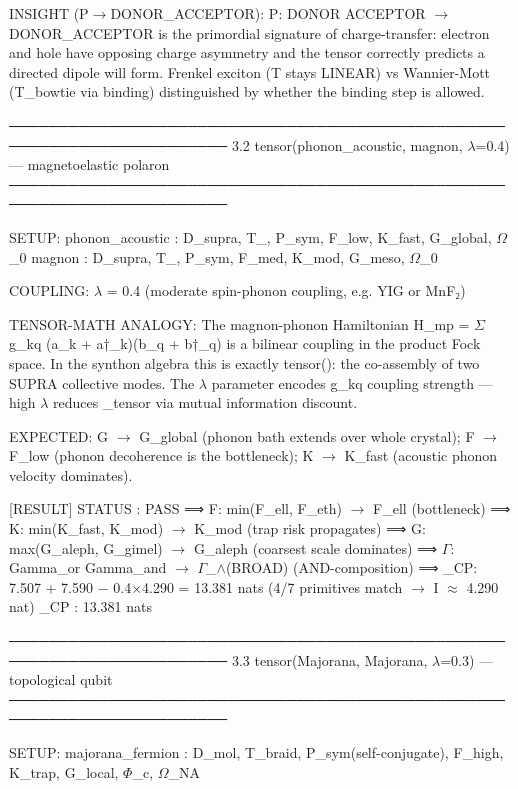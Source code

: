 \documentclass[12pt,a4paper]{article}
\begin{document}
INSIGHT (P$\rightarrow$DONOR\_ACCEPTOR):
P: DONOR \otimes ACCEPTOR $\rightarrow$ DONOR\_ACCEPTOR is the primordial signature of
charge-transfer: electron and hole have opposing charge asymmetry and
the tensor correctly predicts a directed dipole will form.
Frenkel exciton (T stays LINEAR) vs Wannier-Mott (T\_bowtie via binding)
distinguished by whether the binding step is allowed.

────────────────────────────────────────────────────────────────────────
3.2  tensor(phonon\_acoustic, magnon, $\lambda$=0.4) --- magnetoelastic polaron
────────────────────────────────────────────────────────────────────────

SETUP:
phonon\_acoustic : D\_supra, T\_\textbar{}, P\_sym,  F\_low, K\_fast, G\_global, $\Omega$\_0
magnon          : D\_supra, T\_\textbar{}, P\_sym,  F\_med, K\_mod,  G\_meso,   $\Omega$\_0

COUPLING: $\lambda$ = 0.4 (moderate spin-phonon coupling, e.g. YIG or MnF₂)

TENSOR-MATH ANALOGY:
The magnon-phonon Hamiltonian H\_mp = $\Sigma$ g\_kq (a\_k + a†\_k)(b\_q + b†\_q)
is a bilinear coupling in the product Fock space. In the synthon
algebra this is exactly tensor(): the co-assembly of two SUPRA
collective modes. The $\lambda$ parameter encodes g\_kq coupling strength ---
high $\lambda$ reduces \xi\_tensor via mutual information discount.

EXPECTED: G $\rightarrow$ G\_global (phonon bath extends over whole crystal);
F $\rightarrow$ F\_low (phonon decoherence is the bottleneck);
K $\rightarrow$ K\_fast (acoustic phonon velocity dominates).

{[}RESULT{]}
STATUS  : PASS
⟹  F: min(F\_ell, F\_eth) $\rightarrow$ F\_ell (bottleneck)
⟹  K: min(K\_fast, K\_mod) $\rightarrow$ K\_mod (trap risk propagates)
⟹  G: max(G\_aleph, G\_gimel) $\rightarrow$ G\_aleph (coarsest scale dominates)
⟹  $\Gamma$: Gamma\_or \otimes Gamma\_and $\rightarrow$ $\Gamma$\_$\land$(BROAD) (AND-composition)
⟹  \xi\_CP: 7.507 + 7.590 $-$ 0.4$\times$4.290 = 13.381 nats (4/7 primitives match $\rightarrow$ I $\approx$ 4.290 nat)
\xi\_CP    : 13.381 nats

────────────────────────────────────────────────────────────────────────
3.3  tensor(Majorana, Majorana, $\lambda$=0.3) --- topological qubit
────────────────────────────────────────────────────────────────────────

SETUP:
majorana\_fermion : D\_mol, T\_braid, P\_sym(self-conjugate), F\_high,
K\_trap, G\_local, $\Phi$\_c, $\Omega$\_NA
\end{document}
